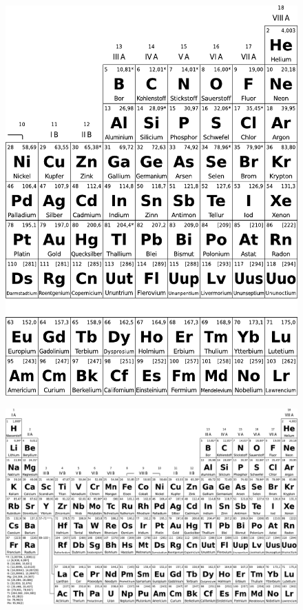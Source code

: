 \begin{appendices}
	\begin{figure}
		\centering
		\includegraphics[width=\textwidth]{periodensystem_2.pdf}
	\end{figure}

	\begin{figure}
		\centering
		\includegraphics[height=\textwidth, 
			angle=90]{periodensystem.pdf}
	\end{figure}

\end{appendices}
